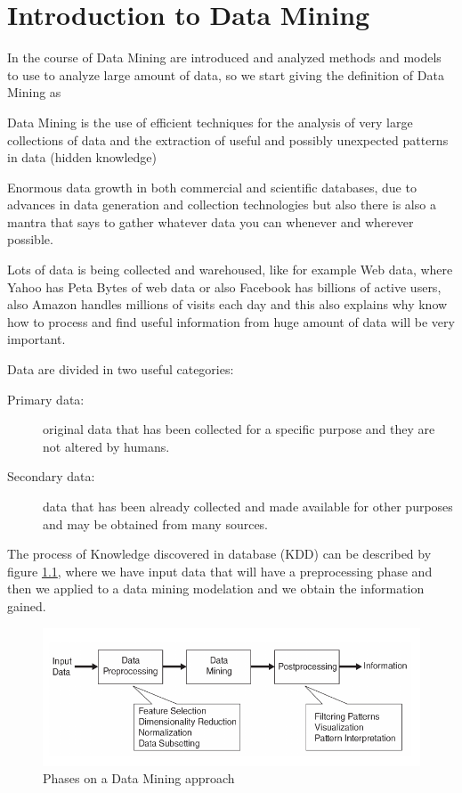 \chapter{Introduction to Data Mining}
In the course of Data Mining are introduced and analyzed methods and models to use to analyze
large amount of data, so we start giving the definition of Data Mining as 
\begin{defi}
Data Mining is the use of efficient techniques for the analysis of very large collections of data and
the extraction of useful and possibly unexpected patterns in data (hidden knowledge)
\end{defi}
Enormous data growth in both commercial and scientific databases, due to advances in data generation and
collection technologies but also there is also a mantra that says to gather whatever data you can whenever and
wherever possible.

Lots of data is being collected and warehoused, like for example Web data, where Yahoo has Peta Bytes of web data
or also Facebook has billions of active users, also Amazon handles millions of visits each day and this also 
explains why know how to process and find useful information from huge amount of data will be very important.

Data are divided in two useful categories:
\begin{description}
    \item [Primary data: ] original data that has been collected for a specific purpose and they are 
                           not altered by humans.
    \item [Secondary data: ] data that has been already collected and made available for other purposes
                             and may be obtained from many sources.
\end{description}
The process of Knowledge discovered in database (KDD) can be described by figure \ref{img:phaseDataMining},
where we have input data that will have a preprocessing phase and then we applied to a data mining modelation and we obtain the information gained.

\begin{figure}
    \caption{Phases on a Data Mining approach}
    \label{img:phaseDataMining}
    \includegraphics[width=\textwidth]{Images/dataMiningProcedure}
\end{figure}

